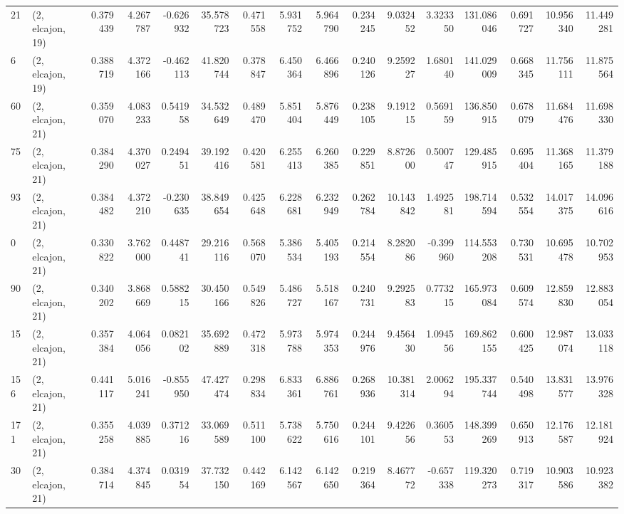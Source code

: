 \begin{tabular}{llrrrrrrrrrrrrrr}
21  &  (2, elcajon, 19) &   0.379439 &   4.267787 & -0.626932 &   35.578723 &  0.471558 &   5.931752 &   5.964790 &  0.234245 &   9.032452 &   3.323350 &  131.086046 &  0.691727 &  10.956340 &  11.449281 \\
6   &  (2, elcajon, 19) &   0.388719 &   4.372166 & -0.462113 &   41.820744 &  0.378847 &   6.450364 &   6.466896 &  0.240126 &   9.259227 &   1.680140 &  141.029009 &  0.668345 &  11.756111 &  11.875564 \\
60  &  (2, elcajon, 21) &   0.359070 &   4.083233 &  0.541958 &   34.532649 &  0.489470 &   5.851404 &   5.876449 &  0.238105 &   9.191215 &   0.569159 &  136.850915 &  0.678079 &  11.684476 &  11.698330 \\
75  &  (2, elcajon, 21) &   0.384290 &   4.370027 &  0.249451 &   39.192416 &  0.420581 &   6.255413 &   6.260385 &  0.229851 &   8.872600 &   0.500747 &  129.485915 &  0.695404 &  11.368165 &  11.379188 \\
93  &  (2, elcajon, 21) &   0.384482 &   4.372210 & -0.230635 &   38.849654 &  0.425648 &   6.228681 &   6.232949 &  0.262784 &  10.143842 &   1.492581 &  198.714594 &  0.532554 &  14.017375 &  14.096616 \\
0   &  (2, elcajon, 21) &   0.330822 &   3.762000 &  0.448741 &   29.216116 &  0.568070 &   5.386534 &   5.405193 &  0.214554 &   8.282086 &  -0.399960 &  114.553208 &  0.730531 &  10.695478 &  10.702953 \\
90  &  (2, elcajon, 21) &   0.340202 &   3.868669 &  0.588215 &   30.450166 &  0.549826 &   5.486727 &   5.518167 &  0.240731 &   9.292583 &   0.773215 &  165.973084 &  0.609574 &  12.859830 &  12.883054 \\
15  &  (2, elcajon, 21) &   0.357384 &   4.064056 &  0.082102 &   35.692889 &  0.472318 &   5.973788 &   5.974353 &  0.244976 &   9.456430 &   1.094556 &  169.862155 &  0.600425 &  12.987074 &  13.033118 \\
156 &  (2, elcajon, 21) &   0.441117 &   5.016241 & -0.855950 &   47.427474 &  0.298834 &   6.833361 &   6.886761 &  0.268936 &  10.381314 &   2.006294 &  195.337744 &  0.540498 &  13.831577 &  13.976328 \\
171 &  (2, elcajon, 21) &   0.355258 &   4.039885 &  0.371216 &   33.069589 &  0.511100 &   5.738622 &   5.750616 &  0.244101 &   9.422656 &   0.360553 &  148.399269 &  0.650913 &  12.176587 &  12.181924 \\
30  &  (2, elcajon, 21) &   0.384714 &   4.374845 &  0.031954 &   37.732150 &  0.442169 &   6.142567 &   6.142650 &  0.219364 &   8.467772 &  -0.657338 &  119.320273 &  0.719317 &  10.903586 &  10.923382 \\

\end{tabular}
